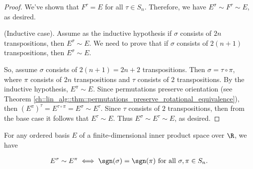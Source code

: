 \begin{proof}
    We've shown that $F^\tau = E$ for all $\tau \in S_n$. Therefore, we have $E^\sigma \sim F^\tau \sim E$, as desired.
    
    (Inductive case). Assume as the inductive hypothesis if $\sigma$ consists of $2n$ transpositions, then $E^\sigma \sim E$. We need to prove that if $\sigma$ consists of $2(n + 1)$ transpositions, then $E^\sigma \sim E$.

    So, assume $\sigma$ consists of $2(n + 1) = 2n + 2$ transpositions. Then $\sigma = \tau \circ \pi$, where $\pi$ consists of $2n$ transpositions and $\tau$ consists of $2$ transpositions. By the inductive hypothesis, $E^\pi \sim E$. Since permutations preserve orientation (see Theorem \ref{ch::lin_alg::thm::permutations_preserve_rotational_equivalence}), then $(E^\pi)^\tau = E^{\tau \circ \pi} = E^\sigma \sim E^\tau$. Since $\tau$ consists of $2$ transpositions, then from the base case it follows that $E^\tau \sim E$. Thus $E^\sigma \sim E^\tau \sim E$, as desired.
\end{proof}

\begin{theorem}
    For any ordered basis $E$ of a finite-dimensional inner product space over $\R$, we have

    \begin{align*}
        E^\sigma \sim E^\pi \iff \sgn(\sigma) = \sgn(\pi) \text{ for all $\sigma, \pi \in S_n$}.
    \end{align*}
\end{theorem}

